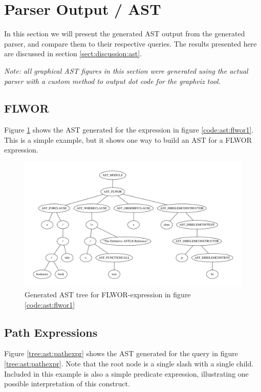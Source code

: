 \section{Parser Output / AST}
\label{sect:results:parser_output_ast}
In this section we will present the generated AST output from the generated
parser, and compare them to their respective queries. The results presented here
are discussed in section \ref{sect:discussion:ast}.

\emph{Note: all graphical AST figures in this section were generated using the
actual parser with a custom method to output dot code for the graphviz tool.}

\pagebreak
\subsection{FLWOR}
Figure \ref{tree:ast:flwor1} shows the AST generated for the expression in
figure \ref{code:ast:flwor1}. This is a simple example, but it shows one way to
build an AST for a FLWOR expression.

\begin{figure}[h!]

\caption{FLWOR expression example, generates AST seen in figure \ref{tree:ast:flwor1}}
\label{code:ast:flwor1}
\centering
 \includegraphics[width=1\textwidth]{img/graphs/flwor1}
\caption{Generated AST tree for FLWOR-expression in figure \ref{code:ast:flwor1}}
\label{tree:ast:flwor1}
\end{figure}

\pagebreak
\subsection{Path Expressions}
Figure \ref{tree:ast:pathexpr} shows the AST generated for the query in figure
\ref{tree:ast:pathexpr}. Note that the root node is a single slash with a
single child. Included in this example is also a simple predicate expression,
illustrating one possible interpretation of this construct.

